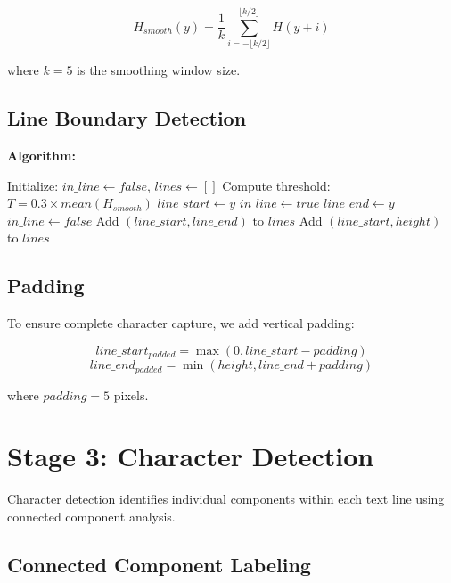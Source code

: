\documentclass[12pt,a4paper,oneside]{report}
\begin{document}
\begin{equation}
    H_{smooth}(y) = \frac{1}{k} \sum_{i=-\lfloor k/2 \rfloor}^{\lfloor k/2 \rfloor} H(y + i)
\end{equation}

where $k = 5$ is the smoothing window size.

\subsection{Line Boundary Detection}

\textbf{Algorithm:}
\begin{algorithmic}[1]
\STATE Initialize: $in\_line \leftarrow false$, $lines \leftarrow []$
\STATE Compute threshold: $T = 0.3 \times mean(H_{smooth})$
        \STATE $line\_start \leftarrow y$
        \STATE $in\_line \leftarrow true$
        \STATE $line\_end \leftarrow y$
        \STATE $in\_line \leftarrow false$
        \STATE Add $(line\_start, line\_end)$ to $lines$
    \ENDIF
\ENDFOR
{} \STATE Add $(line\_start, height)$ to $lines$
\ENDIF
\end{algorithmic}

\subsection{Padding}

To ensure complete character capture, we add vertical padding:

\begin{equation}
    line\_start_{padded} = \max(0, line\_start - padding)
\end{equation}
\begin{equation}
    line\_end_{padded} = \min(height, line\_end + padding)
\end{equation}

where $padding = 5$ pixels.

\section{Stage 3: Character Detection}

Character detection identifies individual components within each text line using connected component analysis.

\subsection{Connected Component Labeling}
\end{document}
